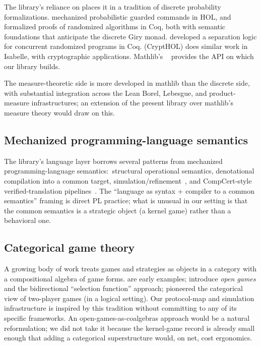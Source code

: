 The library's reliance on  places it in a tradition of
discrete probability formalizations.  \citet{HurdMcIverMorgan2005}
mechanized probabilistic guarded commands in HOL, and
\citet{Audebaud2009} formalized proofs of randomized algorithms
in Coq, both with semantic foundations that anticipate the
discrete Giry monad.  \citet{Tassarotti2019} developed a
separation logic for concurrent randomized programs in Coq.
\citet{Lochbihler2016} (CryptHOL) does similar
work in Isabelle, with cryptographic applications.  Mathlib's
~\citep{mathlib2020} provides the API on which our
library builds.

The measure-theoretic side is more developed in mathlib than the
discrete side, with substantial integration across the Lean Borel,
Lebesgue, and product-measure infrastructures; an extension of the
present library over mathlib's measure theory would draw on this.

\subsection{Mechanized programming-language semantics}
\label{sec:rw:pl}

The library's language layer borrows several patterns from
mechanized programming-language semantics:\ structural
operational semantics, denotational compilation into a common
target, simulation/refinement~\citep{Milner1989, AbramskyJung1994,
HarperPLFA, BentonHurKennedyMcBride2014}, and CompCert-style
verified-translation pipelines~\citep{Leroy2009}.  The
``language as syntax + compiler to a common semantics'' framing
is direct PL practice; what is unusual in our setting is that the
common semantics is a strategic object (a kernel game) rather
than a behavioral one.

\subsection{Categorical game theory}
\label{sec:rw:category}

A growing body of work treats games and strategies as objects in
a category with a compositional algebra of game forms.
\citet{Pavlovic2009, Hyland2010} are early examples;
\citet{GhaniHedgesWinschelZahn2018} introduce \emph{open games}
and the bidirectional ``selection function'' approach;
\citet{Joyal1977} pioneered the categorical view of two-player
games (in a logical setting).  Our protocol-map and simulation
infrastructure is inspired by this tradition without committing
to any of its specific frameworks.  An open-games-as-coalgebras
approach would be a natural reformulation; we did not take it
because the kernel-game record is already small enough that
adding a categorical superstructure would, on net, cost
ergonomics.

